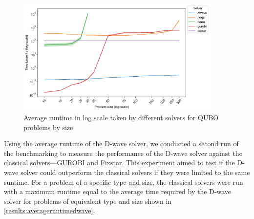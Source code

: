 \begin{figure}[!htbp]
    \centering
    \includegraphics[width=0.9\textwidth]{images/all_time_average.png}
    \caption{Average runtime in log scale taken by different solvers for QUBO problems by size}
    \label{results:timeaverage}
\end{figure}

Using the average runtime of the D-wave solver, we conducted a second run of the benchmarking to measure the performance of the D-wave solver against the classical solvers---GUROBI and Fixstar. This experiment aimed to test if the D-wave solver could outperform the classical solvers if they were limited to the same runtime. For a problem of a specific type and size, the classical solvers were run with a maximum runtime equal to the average time required by the D-wave solver for problems of equivalent type and size shown in \autoref{results:averageruntimedwave}.

\begin{table}[!ht]
    \centering
    \caption{Average runtime (seconds) of the D-wave solver by problem type and size. Dashes indicate that the D-wave solver could not embed problems of that size.}
    \label{results:averageruntimedwave}
\end{table}

